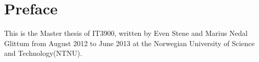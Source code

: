 \chapter*{Preface}
This is the Master thesis of IT3900, written by Even Stene and Marius Nedal Glittum from August 2012 to June 2013 at the Norwegian University of Science and Technology(NTNU).